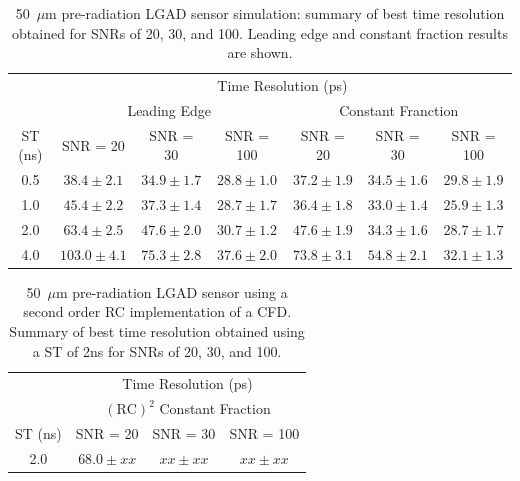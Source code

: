 \documentclass[preprint,1p]{elsarticle}
\begin{document}
\begin{table}\label{tab:shaping_time_prerad}
    \begin{tabular}{c|ccc|ccc}
    \multicolumn{1}{c}{}& \multicolumn{6}{c}{Time Resolution (ps)} \\
    \multicolumn{1}{c}{}&\multicolumn{3}{c}{Leading Edge} & \multicolumn{3}{c}{Constant Franction}\\ \hline
    ST (ns) & SNR = 20   & SNR = 30      & SNR = 100     & SNR = 20      & SNR = 30      & SNR = 100 \\
    0.5 & $38.4 \pm 2.1$  & $34.9 \pm 1.7$  & $28.8 \pm 1.0$  & $37.2 \pm 1.9$  & $34.5 \pm 1.6$  & $29.8 \pm 1.9$ \\
    1.0 & $45.4 \pm 2.2$  & $37.3 \pm 1.4$  & $28.7 \pm 1.7$  & $36.4 \pm 1.8$  & $33.0 \pm 1.4$  & $25.9 \pm 1.3$ \\
    2.0 & $63.4 \pm 2.5$  & $47.6 \pm 2.0$  & $30.7 \pm 1.2$  & $47.6 \pm 1.9$  & $34.3 \pm 1.6$  & $28.7 \pm 1.7$ \\
    4.0 & $103.0 \pm 4.1$  & $75.3 \pm 2.8$  & $37.6 \pm 2.0$  & $73.8 \pm 3.1$  & $54.8 \pm 2.1$  & $32.1 \pm 1.3$ \\
    \end{tabular}
    \caption{50~$\mu$m pre-radiation LGAD sensor simulation: summary of best time resolution obtained for SNRs
    of 20, 30, and 100. Leading edge and constant fraction results are shown.}
 \end{table}


 \begin{table}\label{tab:pcfd}
   \begin{center}
     \begin{tabular}{c|ccc}
     \multicolumn{1}{c}{}& \multicolumn{3}{c}{Time Resolution (ps)} \\
     \multicolumn{1}{c}{}& \multicolumn{3}{c}{$\mathrm{(RC)}^{2}$ Constant Fraction}\\ \hline
     ST (ns) & SNR = 20      & SNR = 30      & SNR = 100 \\
     2.0 & $68.0 \pm xx$  & $xx \pm xx$  & $xx \pm xx$ \\
     \end{tabular}
     \caption{50~$\mu$m pre-radiation LGAD sensor using a second order RC implementation of a CFD.
     Summary of best time resolution obtained using a ST of 2\si{ns} for SNRs of 20, 30, and 100.}
   \end{center}
  \end{table}
\end{document}
